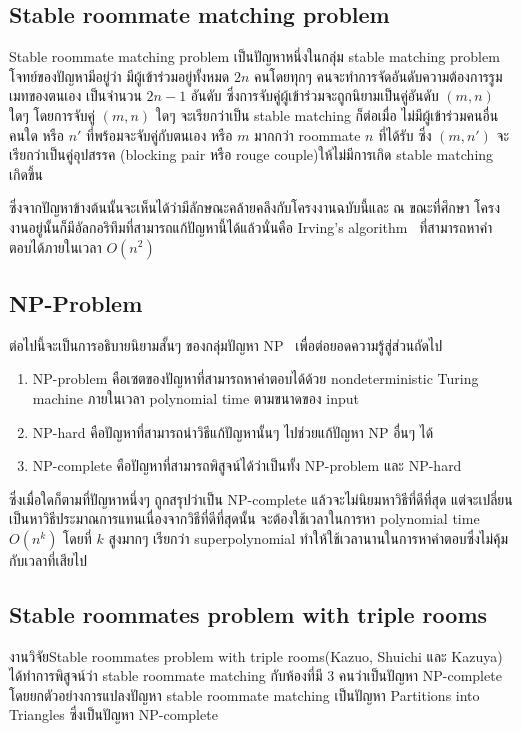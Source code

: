 \subsection{Stable roommate matching problem}
Stable roommate matching problem เป็นปัญหาหนึ่งในกลุ่ม stable matching problem
โจทย์ของปัญหามีอยู่ว่า มีผู้เข้าร่วมอยู่ทั้งหมด $2n$ คนโดยทุกๆ คนจะทำการจัดอันดับความต้องการรูมเมทของตนเอง
เป็นจำนวน $2n-1$ อันดับ ซึ่งการจับคู่ผู้เข้าร่วมจะถูกนิยามเป็นคู่อันดับ $(m,n)$ ใดๆ โดยการจับคู่ $(m,n)$ ใดๆ จะเรียกว่าเป็น
stable matching ก็ต่อเมื่อ ไม่มีผู้เข้าร่วมคนอื่นคนใด หรือ $n'$ ที่พร้อมจะจับคู่กับตนเอง หรือ $m$ มากกว่า roommate $n$ ที่ได้รับ ซึ่ง $(m, n')$
จะเรียกว่าเป็นคู่อุปสรรค (blocking pair หรือ rouge couple)ให้ไม่มีการเกิด stable matching เกิดขึ้น

ซึ่งจากปัญหาข้างต้นนั้นจะเห็นได้ว่ามีลักษณะคล้ายคลึงกับโครงงานฉบับนี้และ ณ ขณะที่ศึกษา
โครงงานอยู่นั้นก็มีอัลกอริทึมที่สามารถแก้ปัญหานี้ได้แล้วนั่นคือ Irving's algorithm~\cite{irving1985efficient} ที่สามารถหาคำตอบได้ภายในเวลา $O(n^2)$

\subsection{NP-Problem}
ต่อไปนี้จะเป็นการอธิบายนิยามสั้นๆ ของกลุ่มปัญหา NP~\cite{np} เพื่อต่อยอดความรู้สู่ส่วนถัดไป
\begin{enumerate}
  \item NP-problem คือเซตของปัญหาที่สามารถหาคำตอบได้ด้วย nondeterministic 
    Turing machine ภายในเวลา polynomial time ตามขนาดของ input
  \item  NP-hard คือปัญหาที่สามารถนำวิธีแก้ปัญหานั้นๆ ไปช่วยแก้ปัญหา NP อื่นๆ ได้
  \item  NP-complete คือปัญหาที่สามารถพิสูจน์ได้ว่าเป็นทั้ง NP-problem และ NP-hard
\end{enumerate}
ซึ่งเมื่อใดก็ตามที่ปัญหาหนึ่งๆ ถูกสรุปว่าเป็น NP-complete แล้วจะไม่นิยมหาวิธีที่ดีที่สุด
แต่จะเปลี่ยนเป็นหาวิธีประมาณการแทนเนื่องจากวิธีที่ดีที่สุดนั้น จะต้องใช้เวลาในการหา polynomial time $O(n^k)$
โดยที่ $k$ สูงมากๆ เรียกว่า superpolynomial ทำให้ใช้เวลานานในการหาคำตอบซึ่งไม่คุ้มกับเวลาที่เสียไป

\subsection{Stable roommates problem with triple rooms}
งานวิจัยStable roommates problem with triple rooms(Kazuo, Shuichi และ Kazuya)\cite{iwama2007stable}
ได้ทำการพิสูจน์ว่า stable roommate matching กับห้องที่มี 3 คนว่าเป็นปัญหา NP-complete 
โดยยกตัวอย่างการแปลงปัญหา stable roommate matching เป็นปัญหา Partitions into Triangles 
ซึ่งเป็นปัญหา NP-complete

